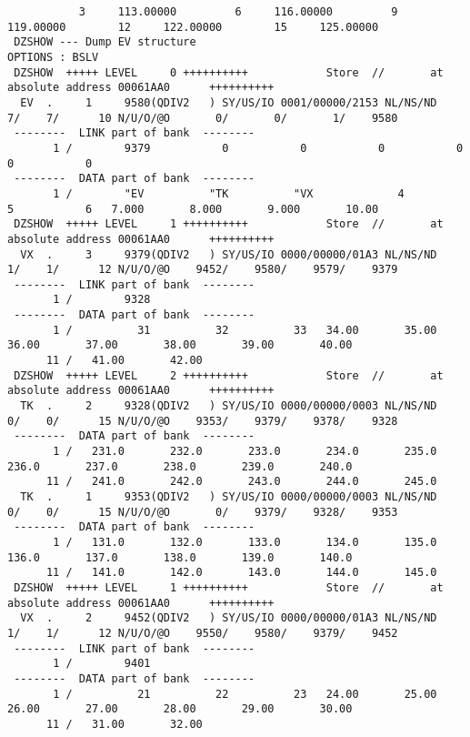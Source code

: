 \begin{Listing}
\begin{verbatim}
           3     113.00000         6     116.00000         9     119.00000        12     122.00000        15     125.00000
 DZSHOW --- Dump EV structure                                                                       OPTIONS : BSLV
 DZSHOW  +++++ LEVEL     0 ++++++++++            Store  //       at absolute address 00061AA0      ++++++++++
  EV  .     1     9580(QDIV2   ) SY/US/IO 0001/00000/2153 NL/NS/ND    7/    7/      10 N/U/O/@O       0/       0/       1/    9580
 --------  LINK part of bank  --------
       1 /        9379           0           0           0           0           0           0
 --------  DATA part of bank  --------
       1 /        "EV          "TK          "VX             4           5           6   7.000       8.000       9.000       10.00
 DZSHOW  +++++ LEVEL     1 ++++++++++            Store  //       at absolute address 00061AA0      ++++++++++
  VX  .     3     9379(QDIV2   ) SY/US/IO 0000/00000/01A3 NL/NS/ND    1/    1/      12 N/U/O/@O    9452/    9580/    9579/    9379
 --------  LINK part of bank  --------
       1 /        9328
 --------  DATA part of bank  --------
       1 /          31          32          33   34.00       35.00       36.00       37.00       38.00       39.00       40.00
      11 /   41.00       42.00
 DZSHOW  +++++ LEVEL     2 ++++++++++            Store  //       at absolute address 00061AA0      ++++++++++
  TK  .     2     9328(QDIV2   ) SY/US/IO 0000/00000/0003 NL/NS/ND    0/    0/      15 N/U/O/@O    9353/    9379/    9378/    9328
 --------  DATA part of bank  --------
       1 /   231.0       232.0       233.0       234.0       235.0       236.0       237.0       238.0       239.0       240.0
      11 /   241.0       242.0       243.0       244.0       245.0
  TK  .     1     9353(QDIV2   ) SY/US/IO 0000/00000/0003 NL/NS/ND    0/    0/      15 N/U/O/@O       0/    9379/    9328/    9353
 --------  DATA part of bank  --------
       1 /   131.0       132.0       133.0       134.0       135.0       136.0       137.0       138.0       139.0       140.0
      11 /   141.0       142.0       143.0       144.0       145.0
 DZSHOW  +++++ LEVEL     1 ++++++++++            Store  //       at absolute address 00061AA0      ++++++++++
  VX  .     2     9452(QDIV2   ) SY/US/IO 0000/00000/01A3 NL/NS/ND    1/    1/      12 N/U/O/@O    9550/    9580/    9379/    9452
 --------  LINK part of bank  --------
       1 /        9401
 --------  DATA part of bank  --------
       1 /          21          22          23   24.00       25.00       26.00       27.00       28.00       29.00       30.00
      11 /   31.00       32.00

\end{verbatim}
\end{Listing}
